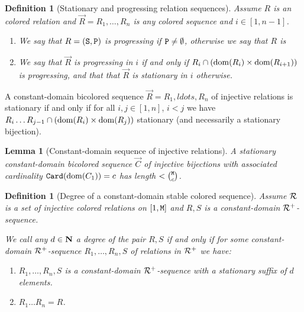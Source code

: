 \documentclass{lmcs}
\newtheorem{lemma}[theorem]{Lemma}
\newtheorem{definition}[theorem]{Definition}
\begin{document}
\begin{definition}[Stationary and progressing relation sequences]
Assume $R$ is an colored relation and $\vec{R}=R_1, \ldots, R_n$ is any colored sequence 
and $i \in [1,n-1]$.
\begin{enumerate}

\item
We say that $R=({\tt S},{\tt P})$ is progressing if ${\tt P} \not = \emptyset$, otherwise we say
that $R$ is 

\item
We say that $\vec{R}$ is progressing in $i$ if and only if 
$R_i \cap ({\rm dom}(R_i) \times {\rm dom}(R_{i+1}))$ is progressing,
and that that $\vec{R}$ is stationary in $i$ otherwise.
\end{enumerate}
\end{definition}

A constant-domain bicolored sequence $\vec{R}=R_1, ldots, R_n$
of injective relations is stationary if and only if for all $i,j \in [1,n]$, $i < j$ we have
$R_i \ldots R_{j-1} \cap ({\rm dom}(R_i) \times {\rm dom}(R_j))$ stationary (and necessarily
a stationary bijection).

\begin{lemma}[Constant-domain sequence of injective relations]
\label{lemma-constant-injective}
A stationary constant-domain bicolored sequence $\vec{C}$ of injective bijections 
with associated cardinality ${\tt Card}({\rm dom}(C_1))=c$ has length $< \newton{\MaxInd}{c}$.
\end{lemma}


\begin{definition}[Degree of a constant-domain stable colored sequence]
Assume ${\mathcal R}$ is a set of injective colored relations on $[1,{\tt M}]$ and
$R,S$ is a constant-domain ${\mathcal R}^+$-sequence. 

We call any $d \in {\bf N}$ a degree of the pair $R,S$ 
if and only if for some constant-domain ${\mathcal R}^+$-sequence 
$R_1, \ldots, R_n, S$ of relations in ${\mathcal R}^+$ we have:

\begin{enumerate}

\item
$R_1, \ldots, R_n, S$ is a constant-domain ${\mathcal R}^+$-sequence with
a \emph{stationary} suffix of $d$ elements. 

\item
$R_1 \ldots R_n = R$.

\end{enumerate}
\end{definition}
\end{document}
